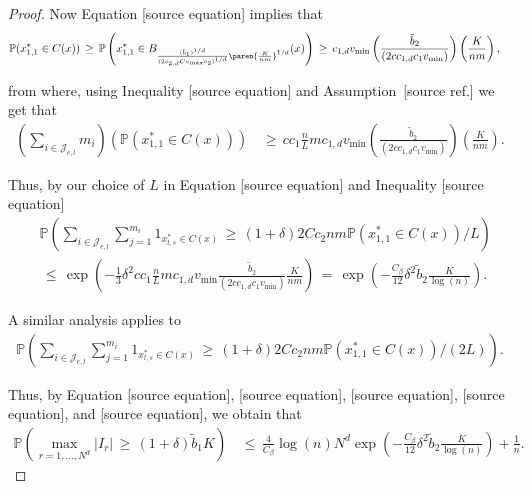 \documentclass[twoside,11pt]{article}
\makeatletter
\newcommand{\rev}[1]{{\color{revisionred}#1}}
\newcommand{\discardlabel}[1]{}
\newcommand{\discardtwo}[2]{}
\newcommand{\legacyref}[1]{\textup{[source ref.]}}
\newcommand{\legacyeqref}[1]{\textup{[source equation]}}
\newenvironment{legacycomparison}{%
  \begingroup\color{legacygray}%
  \let\label\discardlabel
  \let\originallabel\discardlabel
  \let\ref\legacyref
  \let\pageref\legacyref
  \let\eqref\legacyeqref
  \let\cref\legacyref
  \let\Cref\legacyref
  \let\autoref\legacyref
  \let\aliasref\discardtwo
}{\endgroup}
\newcommand{\aliasref}[2]{%
  \@ifundefined{r@#2}{}{%
    \expandafter\let\csname r@#1\expandafter\endcsname\csname r@#2\endcsname}}
\makeatother
\begin{document}
\begin{legacycomparison}
\begin{proof}
Now Equation \eqref{eq:293} implies that
\begin{align}
    \mathbb{P}(x_{1,1}^* \in C(x)) 
    &\,\geq\, \mathbb{P}\left(x_{1,1}^* \in B_{\frac{(\tilde b_1)^{1/d}}{(2c_{2,d} Cv_{\text{max}}c_2)^{1/d}}\paren{\frac{K}{nm}}^{1/d}}(x) \right) \,\geq\, c_{1,d} v_{\text{min}} \left(\frac{\tilde{b}_2}{(2cc_{1,d}c_1v_{\text{min}})}\right) \left(\frac{K}{nm}\right), \label{eq:300}
\end{align}

from where, using Inequality \eqref{eq:289} and Assumption~\ref{asm:m} we get that
\begin{align}
    \left(\sum_{i \in \mathcal{J}_{e,l}} m_i\right) \left(\mathbb{P}(x_{1,1}^* \in C(x)) \right) 
    &\,\geq\, cc_1\frac{n}{L}mc_{1,d} v_{\text{min}} \left(\frac{\tilde{b}_2}{(2cc_{1,d}c_1v_{\text{min}})}\right) \left(\frac{K}{nm}\right). \label{eq:301}
\end{align}

Thus, by our choice of \(L\) in Equation \eqref{eq:288} and Inequality \eqref{eq:298}
\begin{align}
   & \mathbb{P}\left(\sum_{i \in \mathcal{J}_{e,l}} \sum_{j=1}^{m_i} 1_{x_{t,s}^*\in C(x)} \,\geq\, (1+\delta)2Cc_2nm\mathbb{P}(x_{1,1}^* \in C(x)) / L \right) \\
    &\,\leq\, \exp\left(-\frac{1}{3} \delta^2 cc_1\frac{n}{L}mc_{1,d} v_{\text{min}} \frac{\tilde{b}_2}{(2cc_{1,d}c_1v_{\text{min}})} \frac{K}{nm} \right) \,=\, \exp\left(-\frac{C_{\beta}}{12} \delta^2 \tilde b_2 \frac{K}{\log(n)} \right). \label{eq:301__duplicate2}
\end{align}

\rev{A similar analysis applies to}
\begin{align}
    \mathbb{P}\left(\sum_{i \in \mathcal{J}_{e,l}} \sum_{j=1}^{m_i} 1_{x_{t,s}^*\in C(x)} \,\geq\, (1+\delta)2Cc_2nm\mathbb{P}(x_{1,1}^* \in C(x)) / (2L) \right). 
\end{align}

Thus, by Equation \eqref{eq:294}, \eqref{eq:295}, \eqref{eq:296}, \eqref{eq:297}, and \eqref{eq:300}, we obtain that
\begin{align}
    \mathbb{P}\left(\max_{r=1,\ldots,N^d} |I_r| \,\geq\, (1+\delta)\tilde b_1 K \right) 
    &\,\leq\, \frac{4}{C_{\beta}} \log(n)N^d \exp\left(-\frac{C_{\beta}}{12} \delta^2 \tilde b_2 \frac{K}{\log(n)} \right) + \frac{1}{n}. \label{eq:304}
\end{align}



\end{proof}
\end{legacycomparison}
\end{document}
